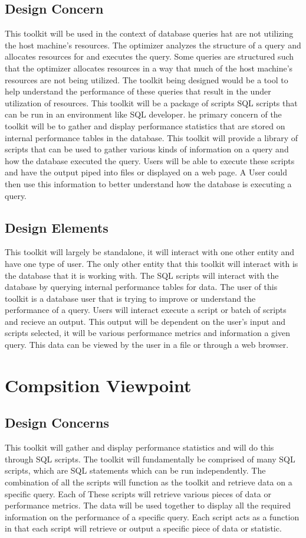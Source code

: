 \documentclass[draftclsnofoot, onecolumn, compsoc, 10pt]{IEEEtran}
\begin{document}
\subsection{Design Concern}
This toolkit will be used in the context of database queries hat are not utilizing the host machine’s resources.
The optimizer analyzes the structure of a query and allocates resources for and executes the query.
Some queries are structured such that the optimizer allocates resources in a way that much of the host machine's resources are not being utilized.
The toolkit being designed would be a tool to help understand the performance of these queries that result in the under utilization of resources.
This toolkit will be a package of scripts SQL scripts that can be run in an environment like SQL developer.
he primary concern of the toolkit will be to gather and display performance statistics that are stored on internal performance tables in the database.
This toolkit will provide a library of scripts that can be used to gather various kinds of information on a query and how the database executed the query.
Users will be able to execute these scripts and have the output piped into files or displayed on a web page.
A User could then use this information to better understand how the database is executing a query.

\subsection{Design Elements}
This toolkit will largely be standalone, it will interact with one other entity and have one type of user.
The only other entity that this toolkit will interact with is the database that it is working with.
The SQL scripts will interact with the database by querying internal performance tables for data.
The user of this toolkit is a database user that is trying to improve or understand the performance of a query.
Users will interact execute a script or batch of scripts and recieve an output.
This output will be dependent on the user's input and scripts selected,  it will be various performance metrics and information a given query. This data can be viewed by the user in a file or through a web browser. 

\section{Compsition Viewpoint}
\subsection{Design Concerns}
This toolkit will gather and display performance statistics and will do this through SQL scripts.
The toolkit will fundamentally be comprised of many SQL scripts, which are SQL statements which can be run independently.
The combination of all the scripts will function as the toolkit and retrieve data on a specific query.
Each of These scripts will retrieve various pieces of data or performance metrics.
The data  will be used together to display all the required information on the performance of a specific query.
Each script acts as a function in that each script will retrieve or output a specific piece of data or statistic.
\end{document}
